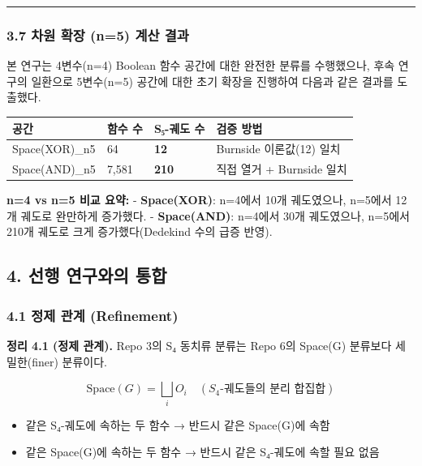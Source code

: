 \documentclass[
]{article}
\newcounter{none} %
\providecommand{\tightlist}{%
  \setlength{\itemsep}{0pt}\setlength{\parskip}{0pt}}
\begin{document}
\begin{center}\rule{0.5\linewidth}{0.5pt}\end{center}

\subsubsection{3.7 차원 확장 (n=5) 계산
결과}\label{uxcc28uxc6d0-uxd655uxc7a5-n5-uxacc4uxc0b0-uxacb0uxacfc}

본 연구는 4변수(n=4) Boolean 함수 공간에 대한 완전한 분류를 수행했으나,
후속 연구의 일환으로 5변수(n=5) 공간에 대한 초기 확장을 진행하여 다음과
같은 결과를 도출했다.

{\def\LTcaptype{none} %
\begin{longtable}[]{@{}llll@{}}
\toprule\noalign{}
공간 & 함수 수 & S₅-궤도 수 & 검증 방법 \\
\midrule\noalign{}
\endhead
\bottomrule\noalign{}
\endlastfoot
Space(XOR)\_n5 & 64 & \textbf{12} & Burnside 이론값(12) 일치 \\
Space(AND)\_n5 & 7,581 & \textbf{210} & 직접 열거 + Burnside 일치 \\
\end{longtable}
}

\textbf{n=4 vs n=5 비교 요약:} - \textbf{Space(XOR)}: n=4에서 10개
궤도였으나, n=5에서 12개 궤도로 완만하게 증가했다. -
\textbf{Space(AND)}: n=4에서 30개 궤도였으나, n=5에서 210개 궤도로 크게
증가했다(Dedekind 수의 급증 반영).

\subsection{4. 선행 연구와의
통합}\label{uxc120uxd589-uxc5f0uxad6cuxc640uxc758-uxd1b5uxd569}

\subsubsection{4.1 정제 관계
(Refinement)}\label{uxc815uxc81c-uxad00uxacc4-refinement}

\textbf{정리 4.1 (정제 관계).} Repo 3의 S₄ 동치류 분류는 Repo 6의
Space(G) 분류보다 세밀한(finer) 분류이다.

\[\text{Space}(G) = \bigsqcup_{i} O_i \quad (S_4\text{-궤도들의 분리 합집합})\]

\begin{itemize}
\tightlist
\item
  같은 S₄-궤도에 속하는 두 함수 → 반드시 같은 Space(G)에 속함
\item
  같은 Space(G)에 속하는 두 함수 → 반드시 같은 S₄-궤도에 속할 필요 없음
\end{itemize}
\end{document}
